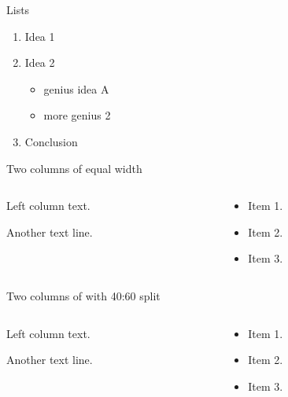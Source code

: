 \documentclass[
  11pt,
  ignorenonframetext,
  aspectratio=169,
  aspectratio=169]{beamer}
\providecommand{\tightlist}{%
  \setlength{\itemsep}{0pt}\setlength{\parskip}{0pt}}
\begin{document}
\begin{frame}{Lists}
\protect\hypertarget{lists}{}
\begin{enumerate}
\tightlist
\item
  Idea 1
\item
  Idea 2

  \begin{itemize}
  \tightlist
  \item
    genius idea A
  \item
    more genius 2
  \end{itemize}
\item
  Conclusion
\end{enumerate}
\end{frame}

\begin{frame}{Two columns of equal width}
\protect\hypertarget{two-columns-of-equal-width}{}
\begin{columns}[T]
\begin{column}{0.48\textwidth}
Left column text.

Another text line.
\end{column}

\begin{column}{0.48\textwidth}
\begin{itemize}
\tightlist
\item
  Item 1.
\item
  Item 2.
\item
  Item 3.
\end{itemize}
\end{column}
\end{columns}
\end{frame}

\begin{frame}{Two columns of with 40:60 split}
\protect\hypertarget{two-columns-of-with-4060-split}{}
\begin{columns}[T]
\begin{column}{0.4\textwidth}
Left column text.

Another text line.
\end{column}

\begin{column}{0.6\textwidth}
\begin{itemize}
\tightlist
\item
  Item 1.
\item
  Item 2.
\item
  Item 3.
\end{itemize}
\end{column}
\end{columns}
\end{frame}
\end{document}
